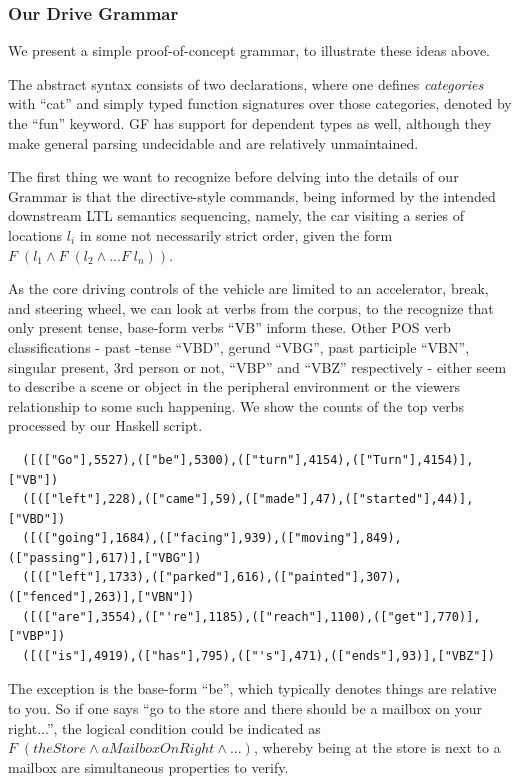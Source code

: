 \documentclass[a4paper, 11pt]{article}
\begin{document}
\subsubsection{Our Drive Grammar}

We present a simple proof-of-concept grammar, to illustrate these ideas above.

The abstract syntax consists of two declarations, where one defines
\emph{categories} with ``cat'' and simply typed function signatures over those
categories, denoted by the ``fun'' keyword. GF has support for dependent types
as well, although they make general parsing undecidable and are relatively
unmaintained.

The first thing we want to recognize before delving into the details of our
Grammar is that the directive-style commands, being informed by the intended
downstream LTL semantics sequencing, namely, the car visiting a series of
locations $l_i$ in some not necessarily strict order, given the form $F\; (l_1
\wedge F\; (l_{2} \wedge ... F\; l_{n}))$.

As the core driving controls of the vehicle are limited to an accelerator,
break, and steering wheel, we can look at verbs from the corpus, to the
recognize that only present tense, base-form verbs ``VB'' inform these. Other
POS verb classifications - past -tense ``VBD'', gerund ``VBG'', past participle
``VBN'', singular present, 3rd person or not, ``VBP'' and ``VBZ'' respectively -
either seem to describe a scene or object in the peripheral environment or the viewers
relationship to some such happening. We show the counts of the top verbs
processed by our Haskell script.


\begin{verbatim}
  ([(["Go"],5527),(["be"],5300),(["turn"],4154),(["Turn"],4154)],["VB"])
  ([(["left"],228),(["came"],59),(["made"],47),(["started"],44)],["VBD"])
  ([(["going"],1684),(["facing"],939),(["moving"],849),(["passing"],617)],["VBG"])
  ([(["left"],1733),(["parked"],616),(["painted"],307),(["fenced"],263)],["VBN"])
  ([(["are"],3554),(["'re"],1185),(["reach"],1100),(["get"],770)],["VBP"])
  ([(["is"],4919),(["has"],795),(["'s"],471),(["ends"],93)],["VBZ"])
\end{verbatim}

The exception is the base-form ``be'', which
typically denotes things are relative to you. So if one says ``go to the store
and there should be a mailbox on your right...'', the logical condition could be
indicated as $F\; (theStore \wedge aMailboxOnRight \wedge ...)$, whereby being
at the store is next to a mailbox are simultaneous properties to verify.
\end{document}
